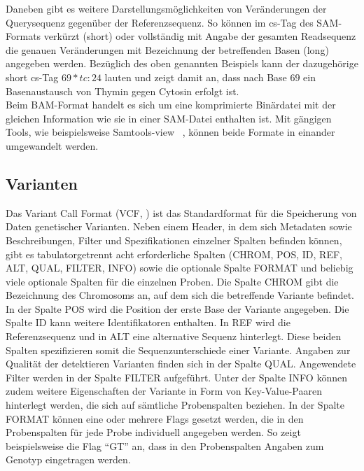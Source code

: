 Daneben gibt es weitere Darstellungsmöglichkeiten von Veränderungen der Querysequenz gegenüber der Referenzsequenz. So können im cs-Tag des SAM-Formats verkürzt (short) oder vollständig mit Angabe der gesamten Readsequenz die genauen Veränderungen mit Bezeichnung der betreffenden Basen (long) angegeben werden. Bezüglich des oben genannten Beispiels kann der dazugehörige short cs-Tag $ 69*tc:24 $ lauten und zeigt damit an, dass nach Base $69$ ein Basenaustausch von Thymin gegen Cytosin erfolgt ist.\\

Beim BAM-Format handelt es sich um eine komprimierte Binärdatei \cite{sam_bam} mit der gleichen Information wie sie in einer SAM-Datei enthalten ist. Mit gängigen Tools, wie beispielsweise Samtools-view ~\cite{li_2009}, können beide Formate in einander umgewandelt werden.

\subsection{Varianten} \label{subsec:vcformat}
Das Variant Call Format (VCF, \cite{danecek_2011}) ist das Standardformat für die Speicherung von Daten genetischer Varianten. Neben einem Header, in dem sich Metadaten sowie Beschreibungen, Filter und Spezifikationen einzelner Spalten befinden können, gibt es tabulatorgetrennt acht erforderliche  Spalten (CHROM, POS, ID, REF, ALT, QUAL, FILTER, INFO) sowie die optionale Spalte FORMAT und beliebig viele optionale Spalten für die einzelnen Proben. Die Spalte CHROM gibt die Bezeichnung des Chromosoms an, auf dem sich die betreffende Variante befindet. In der Spalte POS wird die Position der erste Base der Variante angegeben. Die Spalte ID kann weitere Identifikatoren enthalten. In REF wird die Referenzsequenz und in ALT eine alternative Sequenz hinterlegt. Diese beiden Spalten spezifizieren somit die Sequenzunterschiede einer Variante. Angaben zur Qualität der detektieren Varianten finden sich in der Spalte QUAL. Angewendete Filter werden in der Spalte FILTER aufgeführt. Unter der Spalte INFO können zudem weitere Eigenschaften der Variante in Form von Key-Value-Paaren hinterlegt werden, die sich auf sämtliche Probenspalten beziehen. In der Spalte FORMAT können eine oder mehrere Flags gesetzt werden, die in den Probenspalten für jede Probe individuell angegeben werden. So zeigt beispielsweise die Flag ``GT'' an, dass in den Probenspalten Angaben zum Genotyp eingetragen werden.
\let\cleardoublepage\clearpage